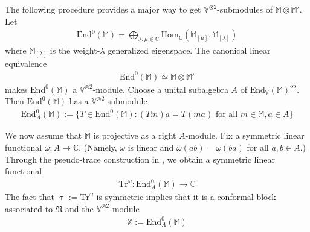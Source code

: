 \documentclass[11pt,b5paper,notitlepage]{article}
\theoremstyle{definition}
\theoremstyle{plain}
\newcommand{\Tr}{\mathrm{Tr}}
\newcommand{\End}{\mathrm{End}} %
\newcommand{\Hom}{\mathrm{Hom}}
\newcommand{\Vbb}{\mathbb V}
\newcommand{\Xbb}{\mathbb X}
\newcommand{\Mbb}{\mathbb M}
\newcommand{\Cbb}{\mathbb C}
\newcommand{\<}{\left\langle}
\renewcommand{\>}{\right\rangle}
\newcommand{\fn}{\mathfrak{N}}
\numberwithin{equation}{section}
\begin{document}
The following procedure provides a major way to get $\Vbb^{\otimes 2}$-submodules of $\Mbb\otimes\Mbb'$. Let
\begin{align*}
\End^0(\Mbb)=\bigoplus_{\lambda,\mu\in\Cbb}\Hom_\Cbb(\Mbb_{[\mu]},\Mbb_{[\lambda]})
\end{align*}
where $\Mbb_{[\lambda]}$ is the weight-$\lambda$ generalized eigenspace. The canonical linear equivalence
\begin{align*}
\End^0(\Mbb)\simeq\Mbb\otimes\Mbb'
\end{align*}
makes $\End^0(\Mbb)$ a $\Vbb^{\otimes 2}$-module. Choose a unital subalgebra $A$ of $\End_\Vbb(\Mbb)^{\mathrm{op}}$. Then $\End^0(\Mbb)$ has a $\Vbb^{\otimes 2}$-submodule
\begin{align*}
\End_A^0(\Mbb):=\{T\in\End^0(\Mbb):(Tm)a=T(m a)\text{ for all }m\in\Mbb,a\in A\}
\end{align*}

We now assume that $\Mbb$ is projective as a right $A$-module. Fix a symmetric linear functional $\omega:A\rightarrow\Cbb$. (Namely, $\omega$ is linear and $\omega(ab)=\omega(ba)$ for all $a,b\in A$.) Through the pseudo-trace construction in \cite{Ari10}, we obtain a symmetric linear functional
\begin{align*}
\Tr^\omega:\End^0_A(\Mbb)\rightarrow\Cbb
\end{align*}
The fact that $\uptau:=\Tr^\omega$ is symmetric implies that it is a conformal block associated to $\fn$ and the $\Vbb^{\otimes 2}$-module
\begin{align*}
\Xbb:=\End^0_A(\Mbb)
\end{align*}
\end{document}
